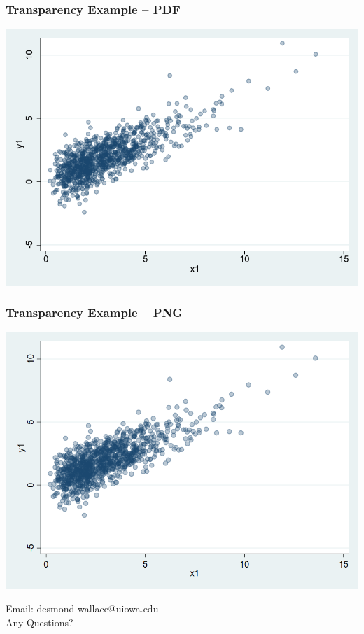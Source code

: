 \documentclass{beamer}
\begin{document}
\begin{frame}
	\frametitle{Transparency Example -- PDF}
		\includegraphics[scale=0.7]{DVgraph02b.pdf}
\end{frame}

\begin{frame}
	\frametitle{Transparency Example -- PNG}
		\includegraphics[scale=0.3]{DVgraph02b.png}
\end{frame}

\begin{frame}
	\begin{center}
		\begin{LARGE}
			Email: desmond-wallace@uiowa.edu\\
			Any Questions?
		\end{LARGE}
	\end{center}
\end{frame}
\end{document}
